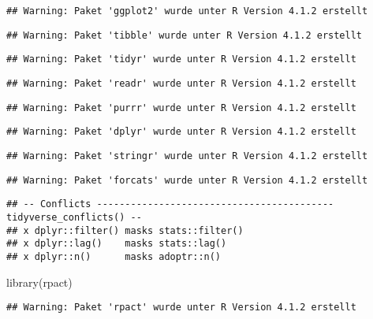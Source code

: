 \documentclass[
]{book}
\newenvironment{Shaded}{\begin{snugshade}}{\end{snugshade}}
\newcommand{\FunctionTok}[1]{\textcolor[rgb]{0.00,0.00,0.00}{#1}}
\newcommand{\NormalTok}[1]{#1}
\begin{document}
\begin{verbatim}
## Warning: Paket 'ggplot2' wurde unter R Version 4.1.2 erstellt
\end{verbatim}

\begin{verbatim}
## Warning: Paket 'tibble' wurde unter R Version 4.1.2 erstellt
\end{verbatim}

\begin{verbatim}
## Warning: Paket 'tidyr' wurde unter R Version 4.1.2 erstellt
\end{verbatim}

\begin{verbatim}
## Warning: Paket 'readr' wurde unter R Version 4.1.2 erstellt
\end{verbatim}

\begin{verbatim}
## Warning: Paket 'purrr' wurde unter R Version 4.1.2 erstellt
\end{verbatim}

\begin{verbatim}
## Warning: Paket 'dplyr' wurde unter R Version 4.1.2 erstellt
\end{verbatim}

\begin{verbatim}
## Warning: Paket 'stringr' wurde unter R Version 4.1.2 erstellt
\end{verbatim}

\begin{verbatim}
## Warning: Paket 'forcats' wurde unter R Version 4.1.2 erstellt
\end{verbatim}

\begin{verbatim}
## -- Conflicts ------------------------------------------ tidyverse_conflicts() --
## x dplyr::filter() masks stats::filter()
## x dplyr::lag()    masks stats::lag()
## x dplyr::n()      masks adoptr::n()
\end{verbatim}

\begin{Shaded}
\begin{Highlighting}[]
\FunctionTok{library}\NormalTok{(rpact)}
\end{Highlighting}
\end{Shaded}

\begin{verbatim}
## Warning: Paket 'rpact' wurde unter R Version 4.1.2 erstellt
\end{verbatim}
\end{document}
